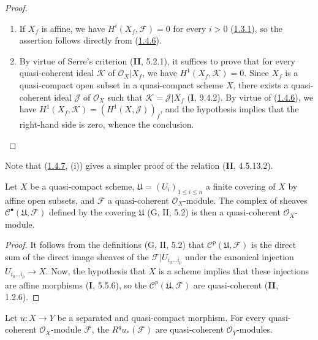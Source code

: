 \begin{proof}
\begin{enumerate}
\item[(i)] If $X_f$ is affine, we have $H^i(X_f,\mathcal F)=0$ for every
$i>0$ (\hyperref[III.1.3.1]{1.3.1}), so the assertion follows directly
from (\hyperref[III.1.4.6]{1.4.6}).
\item[(ii)] By virtue of Serre's criterion (\textbf{II}, 5.2.1), it suffices to prove
that for every quasi-coherent ideal $\mathcal K$ of
$\mathcal O_X\vert X_f$, we have $H^1(X_f,\mathcal K)=0$. Since $X_f$ is a
quasi-compact open subset in a quasi-compact scheme $X$, there exists a
quasi-coherent ideal $\mathcal J$ of $\mathcal O_X$ such that
$\mathcal K=\mathcal J\vert X_f$ (\textbf{I}, 9.4.2). By virtue of
(\hyperref[III.1.4.6]{1.4.6}), we have
$H^1(X_f,\mathcal K)=(H^1(X,\mathcal J))_f$, and the hypothesis implies that
the right-hand side is zero, whence the conclusion.
\end{enumerate}
\end{proof}

\begin{remark}[1.4.8]
\label{III.1.4.8}
Note that (\hyperref[III.1.4.7]{1.4.7}, (i)) gives a simpler
proof of the relation (\textbf{II}, 4.5.13.2).
\end{remark}

\begin{lemma}[1.4.9]
\label{III.1.4.9}
Let $X$ be a quasi-compact scheme,
$\mathfrak U=(U_i)_{1\leq i\leq n}$ a finite covering of $X$ by affine
open subsets, and $\mathcal F$ a quasi-coherent $\mathcal O_X$-module. The
complex of sheaves $\mathcal C^\bullet(\mathfrak U,\mathcal F)$ defined
by the covering $\mathfrak U$ \textup{(G, II, 5.2)} is then a quasi-coherent
$\mathcal O_X$-module.
\end{lemma}

\begin{proof}
It follows from the definitions (G, II, 5.2) that
$\mathcal C^p(\mathfrak U,\mathcal F)$ is the direct sum of the direct image
sheaves of the $\mathcal F\vert U_{i_0\ldots i_p}$ under the canonical
injection $U_{i_0\ldots i_p}\to X$. Now, the hypothesis that $X$ is a scheme
implies that these injections are affine morphisms (\textbf{I}, 5.5.6), so the
$\mathcal C^p(\mathfrak U,\mathcal F)$ are quasi-coherent (\textbf{II}, 1.2.6).
\end{proof}

\begin{proposition}[1.4.10]
\label{III.1.4.10}
Let $u:X\to Y$ be a separated and quasi-compact morphism. For every
quasi-coherent $\mathcal O_X$-module $\mathcal F$, the
$R^qu_*(\mathcal F)$ are quasi-coherent $\mathcal O_Y$-modules.
\end{proposition}

